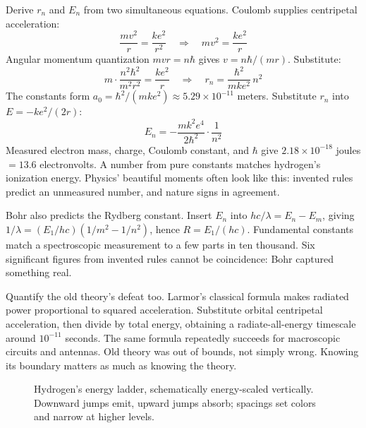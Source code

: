 \begin{mathbridge}
Derive \(r_{n}\) and \(E_{n}\) from two simultaneous equations. Coulomb supplies centripetal acceleration:
\[
\frac{mv^{2}}{r}=\frac{ke^{2}}{r^{2}}\quad\Longrightarrow\quad mv^{2}=\frac{ke^{2}}{r}
\]
Angular momentum quantization \(mvr=n\hbar\) gives \(v=n\hbar/(mr)\). Substitute:
\[
m\cdot\frac{n^{2}\hbar^{2}}{m^{2}r^{2}}=\frac{ke^{2}}{r}\quad\Longrightarrow\quad r_{n}=\frac{\hbar^{2}}{mke^{2}}\,n^{2}
\]
The constants form \(a_{0}=\hbar^{2}/(mke^{2})\approx5.29\times10^{-11}\) meters. Substitute \(r_{n}\) into \(E=-ke^{2}/(2r)\):
\[
E_{n}=-\frac{mk^{2}e^{4}}{2\hbar^{2}}\cdot\frac{1}{n^{2}}
\]
Measured electron mass, charge, Coulomb constant, and \(\hbar\) give \(2.18\times10^{-18}\) joules \(=13.6\) electronvolts. A number from pure constants matches hydrogen's ionization energy. Physics' beautiful moments often look like this: invented rules predict an unmeasured number, and nature signs in agreement.
\end{mathbridge}

\begin{challenge}
Bohr also predicts the Rydberg constant. Insert \(E_{n}\) into \(hc/\lambda=E_{n}-E_{m}\), giving \(1/\lambda=(E_{1}/hc)(1/m^{2}-1/n^{2})\), hence \(R=E_{1}/(hc)\). Fundamental constants match a spectroscopic measurement to a few parts in ten thousand. Six significant figures from invented rules cannot be coincidence: Bohr captured something real.

Quantify the old theory's defeat too. Larmor's classical formula makes radiated power proportional to squared acceleration. Substitute orbital centripetal acceleration, then divide by total energy, obtaining a radiate-all-energy timescale around \(10^{-11}\) seconds. The same formula repeatedly succeeds for macroscopic circuits and antennas. Old theory was out of bounds, not simply wrong. Knowing its boundary matters as much as knowing the theory.
\end{challenge}

\begin{figure}[htbp]
\centering
{}
\caption{Hydrogen's energy ladder, schematically energy-scaled vertically. Downward jumps emit, upward jumps absorb; spacings set colors and narrow at higher levels.}
\end{figure}


